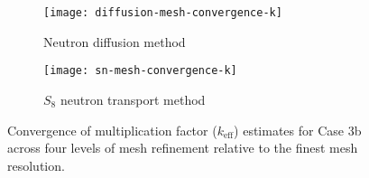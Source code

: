
\begin{figure}[t]
  \centering
  \begin{subfigure}[b]{0.48\columnwidth}
    \centering
    \texttt{[image: diffusion-mesh-convergence-k]}
    \caption{Neutron diffusion method}
    \label{fig:diff-mesh-k}
  \end{subfigure}
  \hfill
  \begin{subfigure}[b]{0.48\columnwidth}
    \centering
    \texttt{[image: sn-mesh-convergence-k]}
    \caption{$S_8$ neutron transport method}
    \label{fig:sn-mesh-k}
  \end{subfigure}
  \caption{Convergence of multiplication factor ($k_\text{eff}$) estimates for Case 3b across four
    levels of mesh refinement relative to the finest mesh resolution.}
  \label{fig:mesh-k}
\end{figure}

